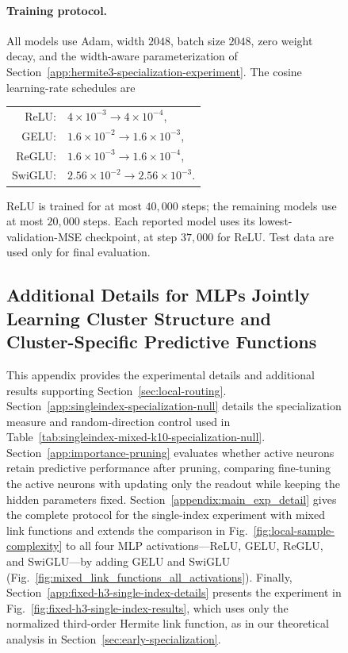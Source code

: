 \documentclass{article}
\newcounter{model}[section]
\begin{document}
\begin{figure}
\paragraph{Training protocol.}
All models use Adam, width \(2048\), batch size \(2048\), zero weight decay,
and the width-aware parameterization of
Section~\ref{app:hermite3-specialization-experiment}. The cosine
learning-rate schedules are
\begin{center}
\begin{tabular}{@{}r@{\;}l@{}}
    ReLU:   & \(4\times10^{-3}\to4\times10^{-4}\), \\
    GELU:   & \(1.6\times10^{-2}\to1.6\times10^{-3}\), \\
    ReGLU:  & \(1.6\times10^{-3}\to1.6\times10^{-4}\), \\
    SwiGLU: & \(2.56\times10^{-2}\to2.56\times10^{-3}\).
\end{tabular}
\end{center}
ReLU is trained for at most \(40{,}000\) steps; the remaining models use
at most \(20{,}000\) steps. Each reported model uses its lowest-validation-MSE
checkpoint, at step \(37{,}000\) for ReLU. Test data are used only for
final evaluation.

\FloatBarrier

\subsection{Additional Details for MLPs Jointly Learning Cluster Structure
and Cluster-Specific Predictive Functions}
\label{app:local-routing-details}

This appendix provides the experimental details and additional results
supporting Section~\ref{sec:local-routing}.
Section~\ref{app:singleindex-specialization-null} details the specialization
measure and random-direction control used in
Table~\ref{tab:singleindex-mixed-k10-specialization-null}.
Section~\ref{app:importance-pruning} evaluates whether active neurons
retain predictive performance after pruning, comparing fine-tuning the
active neurons with updating only the readout while keeping the
hidden parameters fixed.
Section~\ref{appendix:main_exp_detail} gives the complete protocol
for the single-index experiment with mixed link functions and extends the
comparison in Fig.~\ref{fig:local-sample-complexity} to all four MLP
activations---ReLU, GELU, ReGLU, and SwiGLU---by adding GELU and SwiGLU
(Fig.~\ref{fig:mixed_link_functions_all_activations}).
Finally, Section~\ref{app:fixed-h3-single-index-details} presents the
experiment in Fig.~\ref{fig:fixed-h3-single-index-results}, which uses only
the normalized third-order Hermite link function, as in our theoretical
analysis in Section~\ref{sec:early-specialization}.


\end{figure}
\end{document}
